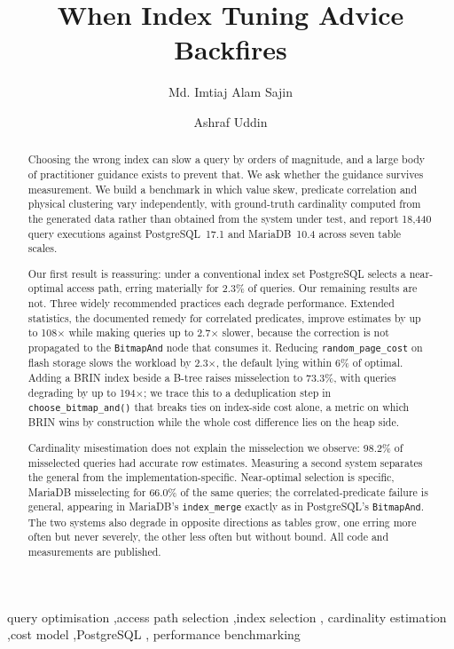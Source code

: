 \documentclass[preprint,12pt,authoryear]{elsarticle}
\newcommand{\rpc}{\texttt{random\_page\_cost}}
\begin{document}
\begin{frontmatter}

\title{When Index Tuning Advice Backfires}

\author[aiub]{Md. Imtiaj Alam Sajin}

\author[aiub]{Ashraf Uddin}


\address[aiub]{Department of Computer Science, American International
University-Bangladesh, 408/1 Kuratoli, Khilkhet, Dhaka 1229, Bangladesh}

\begin{abstract}
Choosing the wrong index can slow a query by orders of magnitude, and a
large body of practitioner guidance exists to prevent that. We ask
whether the guidance survives measurement. We build a benchmark in
which value skew, predicate correlation and physical clustering vary
independently, with ground-truth cardinality computed from the
generated data rather than obtained from the system under test, and
report 18{,}440 query executions against PostgreSQL~17.1 and
MariaDB~10.4 across seven table scales.

Our first result is reassuring: under a conventional index set
PostgreSQL selects a near-optimal access path, erring materially for
2.3\% of queries. Our remaining results are not. Three widely
recommended practices each degrade performance. Extended statistics,
the documented remedy for correlated predicates, improve estimates by
up to 108$\times$ while making queries up to 2.7$\times$ slower, because
the correction is not propagated to the \texttt{BitmapAnd} node that
consumes it. Reducing \rpc{} on flash storage slows the workload by
2.3$\times$, the default lying within 6\% of optimal. Adding a BRIN
index beside a B-tree raises misselection to 73.3\%, with queries
degrading by up to 194$\times$; we trace this to a deduplication step in
\texttt{choose\_bitmap\_and()} that breaks ties on index-side cost
alone, a metric on which BRIN wins by construction while the whole cost
difference lies on the heap side.

Cardinality misestimation does not explain the misselection we observe:
98.2\% of misselected queries had accurate row estimates. Measuring a
second system separates the general from the implementation-specific.
Near-optimal selection is specific, MariaDB misselecting for 66.0\% of
the same queries; the correlated-predicate failure is general,
appearing in MariaDB's \texttt{index\_merge} exactly as in PostgreSQL's
\texttt{BitmapAnd}. The two systems also degrade in opposite directions
as tables grow, one erring more often but never severely, the other
less often but without bound. All code and measurements are published.
\end{abstract}

\begin{keyword}
query optimisation \sep access path selection \sep index selection \sep
cardinality estimation \sep cost model \sep PostgreSQL \sep
performance benchmarking
\end{keyword}

\end{frontmatter}
\end{document}

